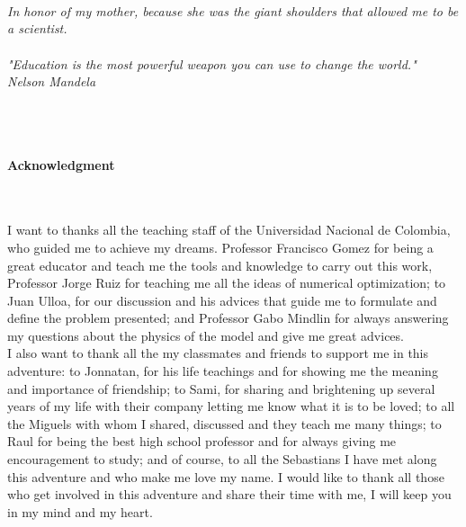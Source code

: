 
\newpage
\thispagestyle{empty} \textbf{}\normalsize
\\\\\\%

\begin{flushright}
\begin{minipage}{8cm}
    \noindent
        \small
        \textit{In honor of my mother, because she was the giant shoulders that allowed me to be a scientist. \\ \\
        "Education is the most powerful weapon you can use to change the world."\\
        \hspace*{\fill}  Nelson Mandela}\\
\end{minipage}
\end{flushright}

\newpage
\thispagestyle{empty} \textbf{}\normalsize
\\\\\\%
\textbf{\LARGE Acknowledgment}
\\\\

I want to thanks all the teaching staff of the Universidad Nacional de Colombia, who guided me to achieve my dreams. Professor Francisco Gomez for being a great educator and teach me the tools and knowledge to carry out this work, Professor Jorge Ruiz for teaching me all the ideas of numerical optimization; to Juan Ulloa, for our discussion and his advices that guide me to formulate and define the problem presented; and Professor Gabo Mindlin for always answering my questions about the  physics of the model and give me great advices. \\

I also want to thank all the my classmates and  friends to support me in this adventure: to Jonnatan, for his life teachings and for showing me the meaning and importance of friendship; to Sami, for sharing and brightening up several years of my life with their company letting me know what it is to be loved; to all the Miguels with whom I shared, discussed and they teach me many things; to Raul for being the best high school professor and for always giving me encouragement to study; and of course, to all the Sebastians I have met along this adventure and who make me love my name. I would like to thank all those who get involved in this adventure and share their time with me, I will keep you in my mind and my heart.\\  

